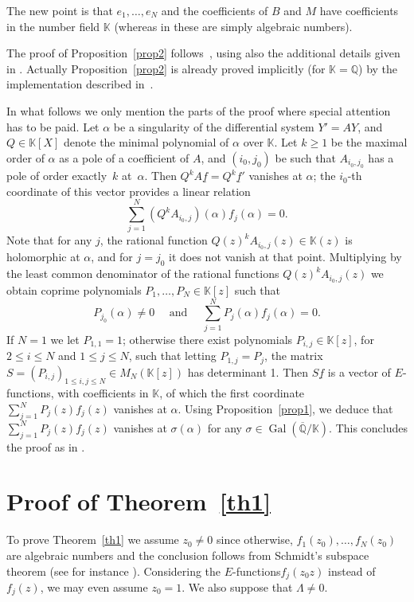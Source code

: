 \documentclass[JEP,XML,SOM,Unicode,published]{cedram}
\newcommand{\Efunctions}{$E$\nobreakdash-func\-tions\xspace}
\theoremstyle{definition}
\newcommand{\Q}{\mathbb{Q}}
\newcommand{\K}{\mathbb{K}}
\newcommand{\Qbar}{\overline{\mathbb Q}}
\DeclareMathOperator{\Gal}{Gal}
\begin{document}
The new point is that $e_1,\ldots,e_N$ and the coefficients of $B$ and $M$ have coefficients in the number field $\K$ (whereas in \cite[Th.\,1.5]{beukers} these are simply algebraic numbers).

The proof of Proposition~\ref{prop2} follows~\cite[p.\,378]{beukers}, using also the additional details given in \cite{BRS2}. Actually Proposition~\ref{prop2} is already proved
implicitly (for $\K=\Q$) by the implementation described in~\cite{BRS2}.

In what follows we only mention the parts of the proof where special attention has to be paid. Let $\alpha$ be a singularity of the differential system $Y'=AY$, and $Q\in\K[X]$ denote the minimal polynomial of $\alpha$ over $\K$. Let $k\geq 1$ be the maximal order of $\alpha$ as a pole of a coefficient of $A$, and $(i_0,j_0)$ be such that $A_{i_0,j_0}$ has a pole of order exactly~$k$ at~$\alpha$. Then $Q^k A\underline f = Q^k \underline f'$ vanishes at $\alpha$; the $i_0$-th coordinate of this vector provides a linear relation
\[
\sum_{j=1}^N (Q^k A_{i_0,j})(\alpha) f_j(\alpha)=0.
\]
Note that for any $j$, the rational function $Q(z)^k A_{i_0,j}(z)\in\K(z)$ is holomorphic at $\alpha$, and for $j=j_0$ it does not vanish at that point. Multiplying by the least common denominator of the rational functions $Q(z)^k A_{i_0,j}(z) $ we obtain coprime polynomials $P_1,\ldots,P_N\in\K[z]$ such that
\[
P_{j_0}(\alpha)\neq 0 \quad \mbox{ and }\quad \sum_{j=1}^N P_j(\alpha) f_j(\alpha)=0.
\]
If $N=1$ we let $P_{1,1}=1$; otherwise there exist polynomials $P_{i,j}\in\K[z]$, for $2\leq i \leq N$ and $1\leq j \leq N$, such that letting $P_{1,j}=P_j$, the matrix $S = (P_{i,j})_{1\leq i,j\leq N}\in M_N(\K[z])$ has determinant 1. Then $S \underline f $ is a vector of \Efunctions, with coefficients in $\K$, of which the first coordinate $ \sum_{j=1}^N P_j(z) f_j(z)$ vanishes at $ \alpha $. Using Proposition~\ref{prop1}, we deduce that $ \sum_{j=1}^N P_j(z) f_j(z)$ vanishes at $\sigma(\alpha)$ for any $\sigma\in\Gal(\Qbar/\K)$. This concludes the proof as in \cite{beukers}.

\section{Proof of Theorem~\ref{th1}} \label{secpreuveth1}

To prove Theorem~\ref{th1} we assume $z_0\neq 0$ since otherwise, $f_1(z_0),\ldots,f_N(z_0)$ are algebraic numbers and the conclusion follows from Schmidt's subspace theorem (see for instance \cite[Ch.\,1, \S 8.2, Th.\,1.37]{EMS}). Considering the \Efunctions $f_j(z_0z)$ instead of $f_j(z)$, we may even assume $z_0=1$. We also suppose that $\Lambda\neq 0$.
\end{document}
